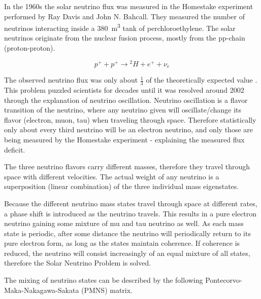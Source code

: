 \documentclass[a4paper,10pt]{scrartcl}
\begin{document}
In the 1960s the solar neutrino flux was measured in the Homestake experiment performed by Ray Davis and John N. Bahcall.
They measured the number of neutrinos interacting inside a \SI{380}{m^3} tank of perchloroethylene.
The solar neutrinos originate from the nuclear fusion process, mostly from the pp-chain (proton-proton).

\begin{equation}
    p^+ + p^+ \longrightarrow {^2H} + e^+ + \nu_e
\end{equation}

The observed neutrino flux was only about $\frac{1}{3}$ of the theoretically expected value \cite{nbi-neutrino}.
This problem puzzled scientists for decades until it was resolved around 2002 through the explanation of neutrino oscillation.
Neutrino oscillation is a flavor transition of the neutrino, where any neutrino given will oscillate/change its flavor (electron, muon, tau) when traveling through space.
Therefore statistically only about every third neutrino will be an electron neutrino, and only those are being measured by the Homestake experiment - explaining the measured flux deficit.

The three neutrino flavors carry different masses, therefore they travel through space with different velocities.
The actual weight of any neutrino is a superposition (linear combination) of the three individual mass eigenstates.

Because the different neutrino mass states travel through space at different rates, a phase shift is introduced as the neutrino travels.
This results in a pure electron neutrino gaining some mixture of mu and tau neutrino as well.
As each mass state is periodic, after some distance the neutrino will periodically return to its pure electron form, as long as the states maintain coherence.
If coherence is reduced, the neutrino will consist increasingly of an equal mixture of all states, therefore the Solar Neutrino Problem is solved.

The mixing of neutrino states can be described by the following Pontecorvo-Maka-Nakagawa-Sakata (PMNS) matrix.
\end{document}
